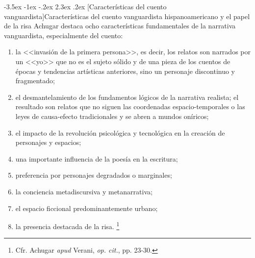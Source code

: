 \documentclass[14pt,twoside,final]{extbook} %
\makeatletter
\let\oldfootnote\footnote
\renewcommand\footnote[1]{%
\oldfootnote{\hspace{1mm}#1}}
\renewcommand\section{\@startsection {section}{1}{\z@}%
                                     {-3.5ex \@plus -1ex \@minus -.2ex}%
                                     {2.3ex \@plus .2ex}%
                                     {\normalfont\large\bfseries\sc}}
\makeatother
\begin{document}
\section[Características del cuento vanguardista]{Características del cuento vanguardista hispanoamericano y el papel de la
risa}\label{sec:caracteristicas-del-cuento-vanguardista-hispanoamericano-y-el-papel-de-la-risa}
Achugar destaca ocho características fundamentales de la narrativa vanguardista,
especialmente del cuento:
\begin{enumerate}[topsep=14pt,noitemsep] %
\item la <<invasión de la primera persona>>, es decir, los relatos son narrados por un <<yo>> que no es el sujeto sólido y de una pieza de los cuentos de épocas y tendencias artísticas anteriores, sino un personaje discontinuo y fragmentado;
\item el desmantelamiento de los fundamentos lógicos de la narrativa realista; el resultado son relatos que no siguen las coordenadas espacio-temporales o las leyes de causa-efecto tradicionales y se abren a mundos oníricos;
\item el impacto de la revolución psicológica y tecnológica en la creación de personajes y espacios;
\item una importante influencia de la poesía en la escritura;
\item preferencia por personajes degradados o marginales;
\item la conciencia metadiscursiva y metanarrativa;
\item el espacio ficcional predominantemente urbano;
\item la presencia destacada de la risa.\footnote{Cfr. Achugar \emph{apud} Verani, \emph{op. cit.}, pp. 23-30.}
\end{enumerate}
\end{document}
